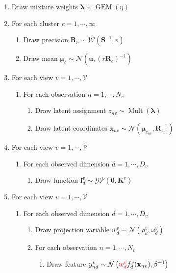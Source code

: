 \documentclass[]{article}
\newcommand{\gD}[2]{\mathcal{N}\left(#1,#2\right)}
\begin{document}
\begin{enumerate}
	\item Draw mixture weights $\boldsymbol{\lambda}\sim \operatorname{GEM}(\eta)$
	\item For each cluster $c = 1, \cdots,\infty $
	\begin{enumerate}
		\item Draw precision $\mathbf{R}_c \sim \mathcal{W}(\mathbf{S}^{-1},v)$
		\item Draw mean $\boldsymbol{\mu}_c \sim \mathcal{N}(\mathbf{u},(r\mathbf{R}_c)^{-1})$
	\end{enumerate}
	
	\item For each view $v = 1, \cdots,\mathcal{V} $
	\begin{enumerate}
		\item For each observation $n = 1,\cdots,N_v$
	\begin{enumerate}
		\item Draw latent assignment $z_{nv} \sim \operatorname{Mult}(\boldsymbol{\lambda})$
		\item Draw latent coordinates $\mathbf{x}_{nv} \sim \mathcal{N}(\boldsymbol{\mu}_{z_{nv}},\mathbf{R}_{z_{nv}}^{-1})$
	\end{enumerate}
	\end{enumerate}

	\item For each view $v = 1, \cdots,\mathcal{V} $
	\begin{enumerate}
		\item For each observed dimension $d = 1,\cdots,D_v$
		\begin{enumerate}
			\item Draw function $\mathbf{f}_{d}^{v} \sim \mathcal{GP}(\mathbf{0},\mathbf{K}^{v})$
		\end{enumerate}
	\end{enumerate}

	\item For each view $v = 1, \cdots,\mathcal{V} $
			
			
	\begin{enumerate}
		
		\item For each observed dimension $d = 1,\cdots,D_v$

		\begin{enumerate}
					\item Draw projection variable ${w}_{d}^v\sim \gD{\rho_d^v}{\omega_d^v}$
			\item For each observation $n = 1,\cdots,N_v$
			\begin{enumerate}
				\item Draw feature $y_{nd}^{v}\sim \gD{\textcolor{red}{{w}_{d}^v}f_d^{v}(\mathbf{x}_{nv})}{\beta^{-1}}$
			\end{enumerate}
		\end{enumerate}
	\end{enumerate}
\end{enumerate}
\end{document}
